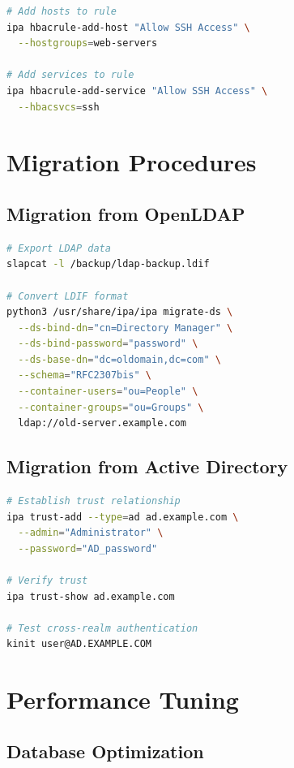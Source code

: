 \documentclass[12pt,a4paper]{report}
\begin{document}
\begin{appendices}
\begin{lstlisting}[language=bash,caption=Host-Based Access Control]
# Add hosts to rule
ipa hbacrule-add-host "Allow SSH Access" \
  --hostgroups=web-servers

# Add services to rule
ipa hbacrule-add-service "Allow SSH Access" \
  --hbacsvcs=ssh
\end{lstlisting}

\chapter{Migration Procedures}

\section{Migration from OpenLDAP}

\begin{lstlisting}[language=bash,caption=OpenLDAP to FreeIPA Migration]
# Export LDAP data
slapcat -l /backup/ldap-backup.ldif

# Convert LDIF format
python3 /usr/share/ipa/ipa migrate-ds \
  --ds-bind-dn="cn=Directory Manager" \
  --ds-bind-password="password" \
  --ds-base-dn="dc=oldomain,dc=com" \
  --schema="RFC2307bis" \
  --container-users="ou=People" \
  --container-groups="ou=Groups" \
  ldap://old-server.example.com
\end{lstlisting}

\section{Migration from Active Directory}

\begin{lstlisting}[language=bash,caption=Active Directory Trust Configuration]
# Establish trust relationship
ipa trust-add --type=ad ad.example.com \
  --admin="Administrator" \
  --password="AD_password"

# Verify trust
ipa trust-show ad.example.com

# Test cross-realm authentication
kinit user@AD.EXAMPLE.COM
\end{lstlisting}

\chapter{Performance Tuning}

\section{Database Optimization}


\end{appendices}
\end{document}
